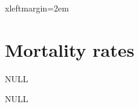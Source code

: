 \documentclass{article}
\begin{document}


 {xleftmargin=2em}
\renewenvironment{Schunk}{\vspace{\topsep}}{\vspace{\topsep}}


\section*{Mortality rates}




\begin{Schunk}
\begin{Soutput}
NULL
\end{Soutput}
\end{Schunk}




\begin{Schunk}
\begin{Soutput}
NULL
\end{Soutput}
\end{Schunk}


\end{document}
